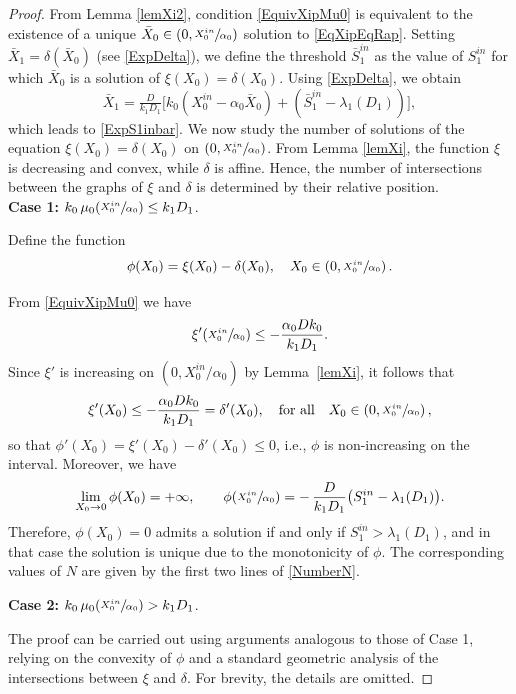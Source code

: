 \documentclass[runningheads]{llncs}
\begin{document}
\begin{proof}
From Lemma \ref{lemXi2}, condition \eqref{EquivXipMu0} is equivalent to the existence of a unique 
$\bar X_0 \in \left(0,\sfrac{X_0^{in}}{\alpha_0}\right)$ solution to \eqref{EqXipEqRap}.
Setting $\bar X_1 = \delta(\bar X_0)$ (see \eqref{ExpDelta}), we define the threshold
$\bar S_1^{in}$ as the value of $S_1^{in}$ for which $\bar X_0$ is a solution of
$\xi(X_0)=\delta(X_0)$. Using \eqref{ExpDelta}, we obtain
\[
\bar X_1
=
\tfrac{D}{k_1 D_1}
\Big[
k_0 (X_0^{in}-\alpha_0 \bar X_0)
+
(\bar S_1^{in}-\lambda_1(D_1))
\Big],
\]
which leads to \eqref{ExpS1inbar}.
We now study the number of solutions of the equation $\xi(X_0)=\delta(X_0)$
on $\left(0,\sfrac{X_0^{in}}{\alpha_0}\right)$.
From Lemma \ref{lemXi}, the function $\xi$ is decreasing and convex, while $\delta$ is affine. Hence, the number of intersections between the graphs of $\xi$ and $\delta$ is determined by their relative position.\\
\noindent \textbf{Case 1:} 
$k_0 \, \mu_0\!\left(\sfrac{X_0^{in}}{\alpha_0}\right) \le k_1 D_1$.

Define the function 
\[
\phi(X_0) = \xi(X_0) - \delta(X_0), \quad X_0 \in \left(0,\sfrac{X_0^{in}}{\alpha_0}\right).
\]

From \eqref{EquivXipMu0} we have 
\[
\xi'\!\left(\sfrac{X_0^{in}}{\alpha_0}\right) \le -\frac{\alpha_0 D k_0}{k_1 D_1}.
\]
Since $\xi'$ is increasing on $(0, X_0^{in}/\alpha_0)$ by Lemma~\ref{lemXi}, it follows that
\[
\xi'(X_0) \le -\frac{\alpha_0 D k_0}{k_1 D_1} = \delta'(X_0), \quad \text{for all} \quad X_0 \in \left(0,\sfrac{X_0^{in}}{\alpha_0}\right),
\]
so that $\phi'(X_0) = \xi'(X_0) - \delta'(X_0) \le 0$, i.e., $\phi$ is non-increasing on the interval.
Moreover, we have
\[
\lim_{X_0 \to 0} \phi(X_0) = +\infty, \qquad
\phi\!\left(\sfrac{X_0^{in}}{\alpha_0}\right) = -\,\frac{D}{k_1 D_1}\big(S_1^{in}-\lambda_1(D_1)\big).
\]
Therefore, $\phi(X_0)=0$ admits a solution if and only if $S_1^{in} > \lambda_1(D_1)$,
and in that case the solution is unique due to the monotonicity of \(\phi\).
The corresponding values of $N$ are given by the first two lines of \eqref{NumberN}.
\medskip

\noindent \textbf{Case 2:} $k_0 \, \mu_0\!\left(\sfrac{X_0^{in}}{\alpha_0}\right) > k_1 D_1$.

The proof can be carried out using arguments analogous to those of Case 1, relying on the convexity of $\phi$ and a standard geometric analysis of the intersections between $\xi$ and $\delta$. For brevity, the details are omitted.
\end{proof}
\end{document}
